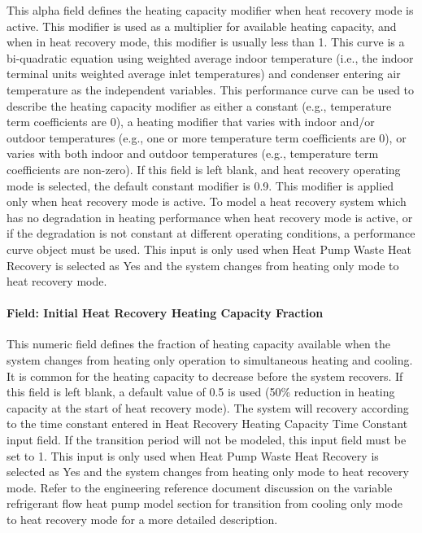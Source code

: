 This alpha field defines the heating capacity modifier when heat recovery mode is active. This modifier is used as a multiplier for available heating capacity, and when in heat recovery mode, this modifier is usually less than 1. This curve is a bi-quadratic equation using weighted average indoor temperature (i.e., the indoor terminal units weighted average inlet temperatures) and condenser entering air temperature as the independent variables. This performance curve can be used to describe the heating capacity modifier as either a constant (e.g., temperature term coefficients are 0), a heating modifier that varies with indoor and/or outdoor temperatures (e.g., one or more temperature term coefficients are 0), or varies with both indoor and outdoor temperatures (e.g., temperature term coefficients are non-zero). If this field is left blank, and heat recovery operating mode is selected, the default constant modifier is 0.9. This modifier is applied only when heat recovery mode is active. To model a heat recovery system which has no degradation in heating performance when heat recovery mode is active, or if the degradation is not constant at different operating conditions, a performance curve object must be used. This input is only used when Heat Pump Waste Heat Recovery is selected as Yes and the system changes from heating only mode to heat recovery mode.

\paragraph{Field: Initial Heat Recovery Heating Capacity Fraction}\label{field-initial-heat-recovery-heating-capacity-fraction}

This numeric field defines the fraction of heating capacity available when the system changes from heating only operation to simultaneous heating and cooling. It is common for the heating capacity to decrease before the system recovers. If this field is left blank, a default value of 0.5 is used (50\% reduction in heating capacity at the start of heat recovery mode). The system will recovery according to the time constant entered in Heat Recovery Heating Capacity Time Constant input field. If the transition period will not be modeled, this input field must be set to 1. This input is only used when Heat Pump Waste Heat Recovery is selected as Yes and the system changes from heating only mode to heat recovery mode. Refer to the engineering reference document discussion on the variable refrigerant flow heat pump model section for transition from cooling only mode to heat recovery mode for a more detailed description.

